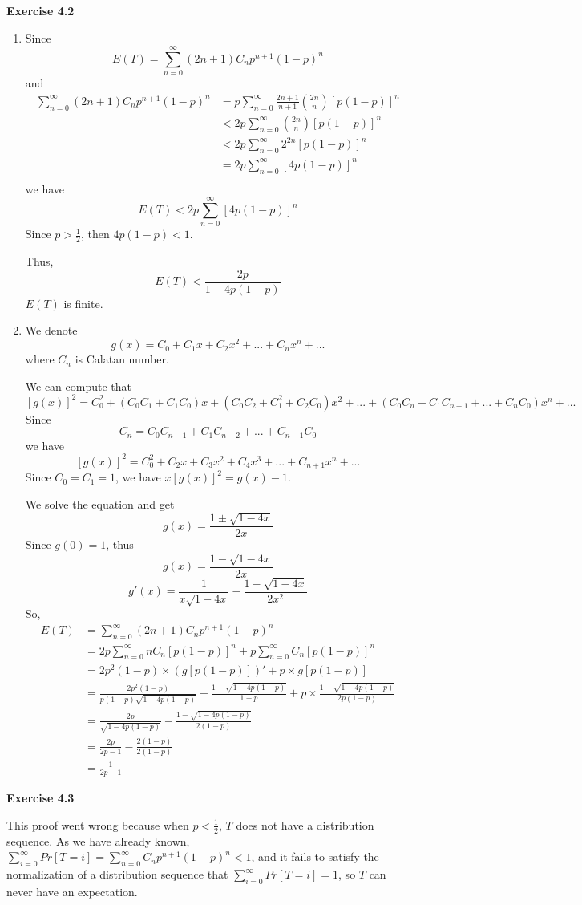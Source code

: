 \documentclass{article} %
\begin{document}
	\textbf{Exercise 4.2}\par
	\begin{enumerate}
	\item Since $$E(T)=\sum_{n=0}^\infty (2n+1)C_{n}p^{n+1}(1-p)^{n}$$
	and
	\begin{align*}
	\sum_{n=0}^\infty (2n+1)C_{n}p^{n+1}(1-p)^{n}&=p\sum_{n=0}^\infty \frac{2n+1}{n+1} \binom{2n}{n}[p(1-p)]^{n}\\
	&<2p\sum_{n=0}^\infty \binom{2n}{n}[p(1-p)]^{n}\\
	&<2p\sum_{n=0}^\infty 2^{2n}[p(1-p)]^{n}\\
	&=2p\sum_{n=0}^\infty [4p(1-p)]^{n}\\
	\end{align*}
	we have $$E(T)<2p\sum_{n=0}^\infty [4p(1-p)]^{n}$$
	Since $p>\frac{1}{2}$, then $4p(1-p)<1$.\par
	Thus, $$E(T)<\frac{2p}{1-4p(1-p)}$$ $E(T)$ is finite.
	\item We denote $$g(x)=C_0+C_1x+C_2x^2+...+C_{n}x^{n}+...$$ where $C_{n}$ is Calatan number.\par
	We can compute that $$[g(x)]^2=C_0^2+(C_0C_1+C_1C_0)x+(C_0C_2+C_1^2+C_2C_0)x^2+...+(C_0C_{n}+C_1C_{n-1}+...+C_{n}C_0)x^{n}+...$$
	Since $$C_{n}=C_0C_{n-1}+C_1C_{n-2}+...+C_{n-1}C_0$$
	we have $$[g(x)]^2=C_0^2+C_2x+C_3x^2+C_4x^3+...+C_{n+1}x^{n}+...$$
	Since $C_0=C_1=1$, we have $x[g(x)]^2=g(x)-1$.\par
	We solve the equation and get
	$$g(x)=\frac{1\pm\sqrt{1-4x}}{2x}$$
	Since $g(0)=1$, thus 
	$$g(x)=\frac{1-\sqrt{1-4x}}{2x}$$
	$$g'(x)=\frac{1}{x\sqrt{1-4x}}-\frac{1-\sqrt{1-4x}}{2x^2}$$
	So,
	\begin{align*}
	E(T)&=\sum_{n=0}^\infty (2n+1)C_{n}p^{n+1}(1-p)^{n}\\
	&=2p\sum_{n=0}^\infty nC_{n}[p(1-p)]^{n}+p\sum_{n=0}^\infty C_{n}[p(1-p)]^{n}\\
	&=2p^2(1-p)\times (g[p(1-p)])'+p\times g[p(1-p)]\\
	&=\frac{2p^2(1-p)}{p(1-p)\sqrt{1-4p(1-p)}}-\frac{1-\sqrt{1-4p(1-p)}}{1-p}+p\times \frac{1-\sqrt{1-4p(1-p)}}{2p(1-p)}\\
	&=\frac{2p}{\sqrt{1-4p(1-p)}}-\frac{1-\sqrt{1-4p(1-p)}}{2(1-p)}\\
	&=\frac{2p}{2p-1}-\frac{2(1-p)}{2(1-p)}\\
	&=\frac{1}{2p-1}
	\end{align*}
	\end{enumerate}


	\textbf{Exercise 4.3}\par
	This proof went wrong because when $p<\frac{1}{2}$, $T$ does not have a distribution sequence. As we have already known, $\sum_{i=0}^{\infty} Pr[T=i]=\sum_{n=0}^{\infty} C_n p^{n+1}(1-p)^n<1$, and it fails to satisfy the normalization of a distribution sequence that $\sum_{i=0}^{\infty} Pr[T=i]=1$, so $T$ can never have an expectation.
	
\end{document}
